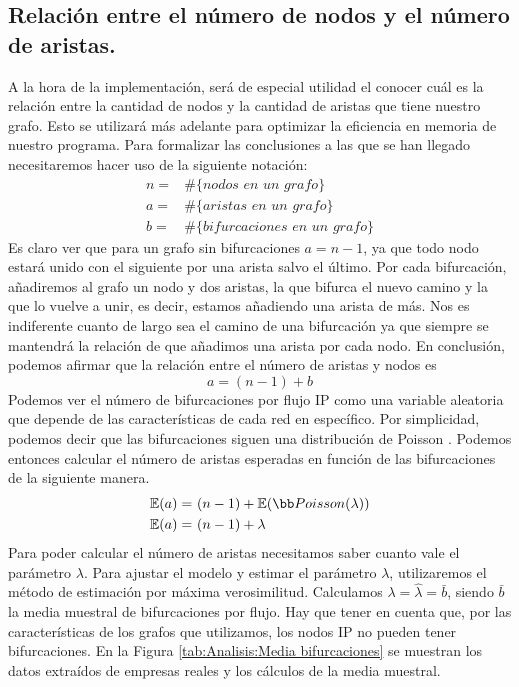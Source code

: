 \documentclass[twoside, 12pt]{epstfg}
\begin{document}
\subsection{Relación entre el número de nodos y el número de aristas.}
\label{sec:Analisis:Edges per node}
A la hora de la implementación, será de especial utilidad el conocer cuál es la relación entre la cantidad de nodos y la cantidad de aristas que tiene nuestro grafo. Esto se utilizará más adelante para optimizar la eficiencia en memoria de nuestro programa. Para formalizar las conclusiones a las que se han llegado necesitaremos hacer uso de la siguiente notación:
\begin{align*}
	n =& \mathbin{\#}\{\textit{nodos en un grafo}\} \\
	a =& \mathbin{\#}\{\textit{aristas en un grafo}\} \\
	b =& \mathbin{\#}\{\textit{bifurcaciones en un grafo}\}
\end{align*}
Es claro ver que para un grafo sin bifurcaciones $a = n-1$, ya que todo nodo estará unido con el siguiente por una arista salvo el último. Por cada bifurcación, añadiremos al grafo un nodo y dos aristas, la que bifurca el nuevo camino y la que lo vuelve a unir, es decir, estamos añadiendo una arista de más. Nos es indiferente cuanto de largo sea el camino de una bifurcación ya que siempre se mantendrá la relación de que añadimos una arista por cada nodo. En conclusión, podemos afirmar que la relación entre el número de aristas y nodos es $$a = (n - 1) + b$$ Podemos ver el número de bifurcaciones por flujo IP como una variable aleatoria que depende de las características de cada red en específico. Por simplicidad, podemos decir que las bifurcaciones siguen una distribución de Poisson \cite{Spiegel}. Podemos entonces calcular el número de aristas esperadas en función de las bifurcaciones de la siguiente manera.
\begin{align*}
    \mathbb{E}(a) =&\ (n - 1) + \mathbb{E}(\bb Poisson(\lambda))\\
    \mathbb{E}(a) =&\ (n - 1) + \lambda \
\end{align*}
Para poder calcular el número de aristas necesitamos saber cuanto vale el parámetro $\lambda$. Para ajustar el modelo y estimar el parámetro $\lambda$, utilizaremos el método de estimación por máxima verosimilitud. Calculamos $\lambda = \widehat{\lambda} = \bar{b}$, siendo $\bar{b}$ la media muestral de bifurcaciones por flujo. Hay que tener en cuenta que, por las características de los grafos que utilizamos, los nodos IP no pueden tener bifurcaciones. En la Figura \ref{tab:Analisis:Media bifurcaciones} se muestran los datos extraídos de empresas reales y los cálculos de la media muestral.
\end{document}
